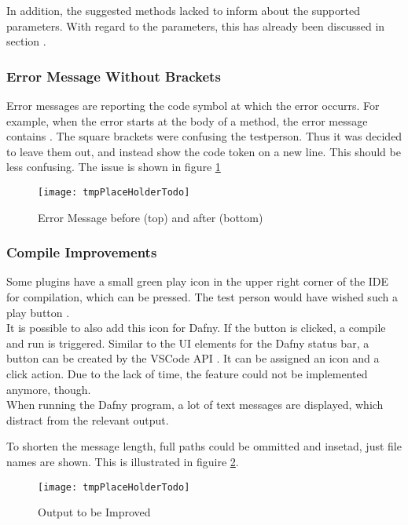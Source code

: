 In addition, the suggested methods lacked to inform about the supported parameters.
With regard to the parameters, this has already been discussed in section  . \\

\subsubsection{Error Message Without Brackets}
Error messages are reporting the code symbol at which the error occurrs.
For example, when the error starts at the body of a method, the error message contains \linebreak
{}.
The square brackets were confusing the testperson.
Thus it was decided to leave them out, and instead show the code token on a new line.
This should be less confusing.
The issue is shown in figure \ref{fig:cleaner_error_msg}

\begin{figure}[H]
    \centering
    \texttt{[image: tmpPlaceHolderTodo]}
    \caption{Error Message before (top) and after (bottom)}
    \label{fig:cleaner_error_msg}
\end{figure}


\subsubsection{Compile Improvements}
Some plugins have a small green play icon in the upper right corner of the IDE for compilation,
which can be pressed.
The test person would have wished such a play button  \cite{interview-remo}. \\

It is possible to also add this icon for Dafny. If the button is clicked, a compile and run is triggered.
Similar to the UI elements for the Dafny status bar,
a button can be created by the VSCode API \cite{vscodeAPI}.
It can be assigned an icon and a click action.
Due to the lack of time, the feature could not be implemented anymore, though.\\

When running the Dafny program,
a lot of text messages are displayed,
which distract from the relevant output.

To shorten the message length, full paths could be ommitted and insetad, just file names are shown.
This is illustrated in figuire \ref{fig:long_compile_output}.

\begin{figure}[H]
    \centering
    \texttt{[image: tmpPlaceHolderTodo]}
    \caption{Output to be Improved}
    \label{fig:long_compile_output}
\end{figure}

